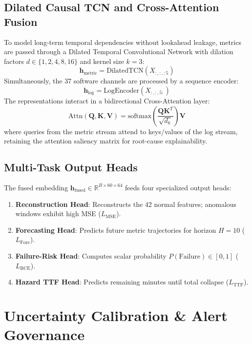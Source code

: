 \documentclass[conference]{IEEEtran}
\begin{document}
\subsection{Dilated Causal TCN and Cross-Attention Fusion}
To model long-term temporal dependencies without lookahead leakage, metrics are passed through a Dilated Temporal Convolutional Network with dilation factors $d \in \{1, 2, 4, 8, 16\}$ and kernel size $k=3$:
\begin{equation}
\mathbf{h}_{\text{metric}} = \text{DilatedTCN}(X_{:, :, :5})
\end{equation}
Simultaneously, the 37 software channels are processed by a sequence encoder:
\begin{equation}
\mathbf{h}_{\text{log}} = \text{LogEncoder}(X_{:, :, 5:})
\end{equation}
The representations interact in a bidirectional Cross-Attention layer:
\begin{equation}
\text{Attn}(\mathbf{Q}, \mathbf{K}, \mathbf{V}) = \text{softmax}\left(\frac{\mathbf{Q} \mathbf{K}^T}{\sqrt{d_k}}\right) \mathbf{V}
\end{equation}
where queries from the metric stream attend to keys/values of the log stream, retaining the attention saliency matrix for root-cause explainability.

\subsection{Multi-Task Output Heads}
The fused embedding $\mathbf{h}_{\text{fused}} \in \mathbb{R}^{B \times 60 \times 64}$ feeds four specialized output heads:
\begin{enumerate}
    \item \textbf{Reconstruction Head}: Reconstructs the 42 normal features; anomalous windows exhibit high MSE ($L_{\text{MSE}}$).
    \item \textbf{Forecasting Head}: Predicts future metric trajectories for horizon $H=10$ ($L_{\text{Fore}}$).
    \item \textbf{Failure-Risk Head}: Computes scalar probability $P(\text{Failure}) \in [0, 1]$ ($L_{\text{BCE}}$).
    \item \textbf{Hazard TTF Head}: Predicts remaining minutes until total collapse ($L_{\text{TTF}}$).
\end{enumerate}

\section{Uncertainty Calibration \& Alert Governance}
\end{document}
